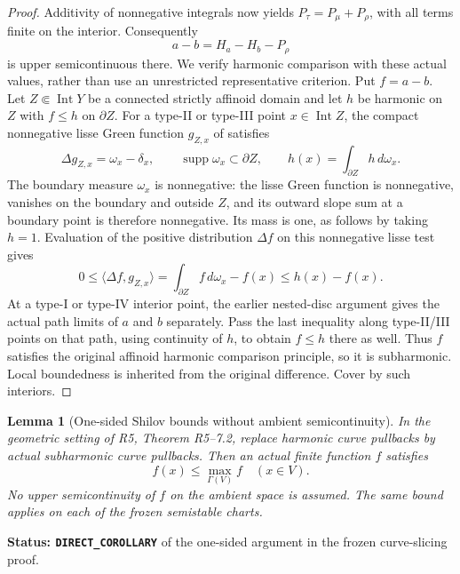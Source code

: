 \documentclass[11pt,a4paper]{article}
\numberwithin{equation}{section}
\newtheorem{lemma}[theorem]{Lemma}
\theoremstyle{definition}
\theoremstyle{remark}
\begin{document}
\begin{proof}
Additivity of nonnegative integrals now yields
$P_\tau=P_\mu+P_\rho$, with all terms finite on the interior.
Consequently
\[
                     a-b=H_a-H_b-P_\rho
\]
is upper semicontinuous there. We verify harmonic comparison with
these actual values, rather than use an unrestricted representative
criterion. Put $f=a-b$. Let $Z\Subset\operatorname{Int}Y$ be a
connected strictly affinoid domain and let $h$ be harmonic on $Z$
with $f\le h$ on $\partial Z$. For a type-II or type-III point
$x\in\operatorname{Int}Z$, the compact nonnegative lisse Green
function $g_{Z,x}$ of \cite[Proposition 2.12]{Wan19} satisfies
\[
 \Delta g_{Z,x}=\omega_x-\delta_x,\qquad
 \operatorname{supp}\omega_x\subset\partial Z,\qquad
 h(x)=\int_{\partial Z}h\,d\omega_x.
\]
The boundary measure $\omega_x$ is nonnegative: the lisse Green
function is nonnegative, vanishes on the boundary and outside $Z$,
and its outward slope sum at a boundary point is therefore
nonnegative. Its mass is one, as follows by taking $h=1$.
Evaluation of the positive distribution $\Delta f$ on this
nonnegative lisse test gives
\[
 0\le\langle\Delta f,g_{Z,x}\rangle
      =\int_{\partial Z}f\,d\omega_x-f(x)
      \le h(x)-f(x).
\]
At a type-I or type-IV interior point, the earlier nested-disc
argument gives the actual path limits of $a$ and $b$ separately.
Pass the last inequality along type-II/III points on that path,
using continuity of $h$, to obtain $f\le h$ there as well.
Thus $f$ satisfies the original affinoid harmonic comparison
principle, so it is subharmonic. Local boundedness is inherited
from the original difference. Cover by such interiors.
\end{proof}

\begin{lemma}[One-sided Shilov bounds without ambient semicontinuity]
\label{lem:r6-subharmonic-shilov-without-usc}
In the geometric setting of R5, Theorem
\textup{R5--7.2}, replace harmonic curve
pullbacks by actual subharmonic curve pullbacks. Then an actual
finite function $f$ satisfies
\[
                       f(x)\le\max_{\Gamma(V)}f\quad(x\in V).
\]
No upper semicontinuity of $f$ on the ambient space is assumed.
The same bound applies on each of the frozen semistable charts.
\end{lemma}

\noindent\textbf{Status: \texttt{DIRECT\_COROLLARY}} of the
one-sided argument in the frozen curve-slicing proof.
\end{document}
